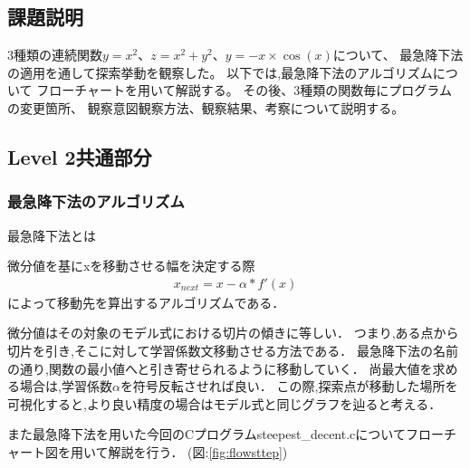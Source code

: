 \subsection{課題説明}
3種類の連続関数$y=x^2$、$z=x^2+y^2$、$y=-x \times \cos(x)$について、
最急降下法の適用を通して探索挙動を観察した。
以下では,最急降下法のアルゴリズムについて
フローチャートを用いて解説する。
その後、3種類の関数毎にプログラムの変更箇所、
観察意図観察方法、観察結果、考察について説明する。


\subsection{Level 2共通部分}

\subsubsection{最急降下法のアルゴリズム}
最急降下法とは
\begin{oframed}
微分値を基にxを移動させる幅を決定する際
\begin{align*}
x_{next} = x - \alpha * f'(x)
\end{align*}
によって移動先を算出するアルゴリズムである．\cite{info2-search1}
\end{oframed}

微分値はその対象のモデル式における切片の傾きに等しい．
つまり,ある点から切片を引き,そこに対して学習係数文移動させる方法である．
最急降下法の名前の通り,関数の最小値へと引き寄せられるように移動していく．
尚最大値を求める場合は,学習係数$\alpha$を符号反転させれば良い．
この際,探索点が移動した場所を可視化すると,より良い精度の場合はモデル式と同じグラフを辿ると考える．

また最急降下法を用いた今回のCプログラムsteepest\_decent.cについてフローチャート図を用いて解説を行う． (図:\ref{fig:flowsttep})

